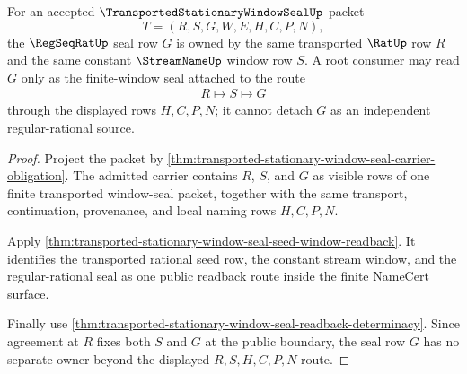 \begin{theorem}
\label{thm:transported-stationary-window-seal-root-regseqrat-window-ownership}
For an accepted $\TransportedStationaryWindowSealUp$ packet
$$
T=(R,S,G,W,E,H,C,P,N),
$$
the $\RegSeqRatUp$ seal row $G$ is owned by the same transported $\RatUp$ row $R$ and the same constant $\StreamNameUp$ window row $S$. A root consumer may read $G$ only as the finite-window seal attached to the route
$$
\begin{aligned}
  R \longmapsto S \longmapsto G
\end{aligned}
$$
through the displayed rows $H,C,P,N$; it cannot detach $G$ as an independent regular-rational source.
\end{theorem}
\begin{proof}
Project the packet by \autoref{thm:transported-stationary-window-seal-carrier-obligation}. The admitted carrier contains $R$, $S$, and $G$ as visible rows of one finite transported window-seal packet, together with the same transport, continuation, provenance, and local naming rows $H,C,P,N$.

Apply \autoref{thm:transported-stationary-window-seal-seed-window-readback}. It identifies the transported rational seed row, the constant stream window, and the regular-rational seal as one public readback route inside the finite NameCert surface.

Finally use \autoref{thm:transported-stationary-window-seal-readback-determinacy}. Since agreement at $R$ fixes both $S$ and $G$ at the public boundary, the seal row $G$ has no separate owner beyond the displayed $R,S,H,C,P,N$ route.
\end{proof}


